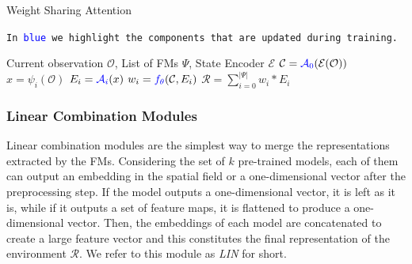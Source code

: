 \begin{algorithm}[ht]
    \caption{Weight Sharing Attention}\label{alg:wsa}
    \texttt{In \textcolor{blue}{blue} we highlight the components that are updated during training.}\\
    \begin{algorithmic}[1]
        \Require Current observation $\mathcal{O}$, List of FMs $\Psi$, State Encoder $\mathcal{E}$
        \State $\mathcal{C} = \textcolor{blue}{\mathcal{A}_0}(\mathcal{E}(\mathcal{O}))$ 
            \State $x = \psi_i(\mathcal{O})$ 
            \State $E_i = \textcolor{blue}{\mathcal{A}_i}(x)$ 
            \State $w_i = \textcolor{blue}{f_\theta}(\mathcal{C}, E_i)$ 
        \EndFor
        \State $\mathcal{R} = \sum_{i=0}^{|\Psi|} w_i * E_i$ 
    \end{algorithmic}
\end{algorithm}





\subsubsection{Linear Combination Modules}\label{subsubsec:linear_combination}
Linear combination modules are the simplest way to merge the representations extracted by the FMs.
Considering the set of $k$ pre-trained models, each of them can output an embedding in the spatial field or a one-dimensional vector after the preprocessing step.
If the model outputs a one-dimensional vector, it is left as it is, while if it outputs a set of feature maps, it is flattened to produce a one-dimensional vector.
Then, the embeddings of each model are concatenated to create a large feature vector and this constitutes the final representation of the environment $\mathcal{R}$.
We refer to this module as \textit{LIN} for short.

